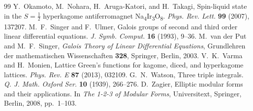 \documentclass[cntp]{ipart}
\theoremstyle{plain}
\theoremstyle{remark}
\begin{document}
\begin{thebibliography}{99}
 Y.~Okamoto, M.~Nohara, H.~Aruga-Katori, and H.~Takagi, Spin-liquid state in the $S=\frac12$ hyperkagome antiferromagnet Na\textsubscript{4}Ir\textsubscript{3}O\textsubscript{8}. \textit{Phys. Rev. Lett.} \textbf{99} (2007), 137207.
 M.~F.~Singer and F.~Ulmer, Galois groups of second and third order linear differential equations. \textit{J. Symb. Comput.} \textbf{16} (1993), 9--36.
 M.~van der Put and M.~F.~Singer, \textit{Galois Theory of Linear Differential Equations}, Grundlehren der mathematischen Wissenschaften \textbf{328}, Springer, Berlin, 2003.
 V.~K.~Varma and H.~Monien, Lattice Green's functions for kagome, diced, and hyperkagome lattices. \textit{Phys. Rev. E} \textbf{87} (2013), 032109.
 G.~N.~Watson, Three triple integrals. \textit{Q. J. Math. Oxford Ser.} \textbf{10} (1939), 266--276.
 D.~Zagier, Elliptic modular forms and their applications. In \textit{The 1-2-3 of Modular Forms}, Universitext, Springer, Berlin, 2008, pp.~1--103.
\end{thebibliography}
\end{document}
